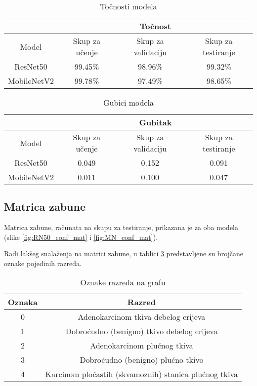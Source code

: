 \documentclass[conference, utf8]{IEEEtran}
\begin{document}

\begin{table}[ht]
	\centering
		\caption{Točnosti modela}
	\label{table:1}
\begin{tabular}{ |c|c|c|c| } 
	\hline
	& \multicolumn{3}{c|}{Točnost} \\
	\hline
	Model & Skup za učenje & Skup za validaciju & Skup za testiranje \\
	\hline \hline
	ResNet50 & 99.45\% & 98.96\% & 99.32\%  \\
	\hline
	MobileNetV2 & 99.78\% & 97.49\% & 98.65\%  \\
	\hline
	\end{tabular}
\end{table}
\begin{table}[ht]
	\centering
	\caption{Gubici modela}
	\label{table:2}
	\begin{tabular}{ |c|c|c|c| } 
		\hline
		& \multicolumn{3}{c|}{Gubitak} \\
		\hline
		Model & Skup za učenje & Skup za validaciju & Skup za testiranje \\
		\hline \hline
		ResNet50 & 0.049 & 0.152 & 0.091  \\
		\hline
		MobileNetV2 & 0.011 & 0.100 & 0.047 \\
		\hline
	\end{tabular}
\end{table}



\pagebreak

\subsection{Matrica zabune}
Matrica zabune, računata na skupu za testiranje, prikazana je za oba modela (slike \ref{fig:RN50_conf_mat} i \ref{fig:MN_conf_mat}).

Radi lakšeg snalaženja na matrici zabune, u tablici \ref{table:3} predstavljene su brojčane oznake pojedinih razreda.

\begin{table}[ht]
	\centering
	\caption{Oznake razreda na grafu}
	\label{table:3}
	\begin{tabular}{ |c|c| } 
		\hline
		Oznaka & Razred \\
		\hline \hline
		0 & Adenokarcinom tkiva debelog crijeva \\
		\hline
		1 & Dobroćudno (benigno) tkivo debelog crijeva \\
		\hline
		2 & Adenokarcinom plućnog tkiva \\
		\hline
		3 & Dobroćudno (benigno) plućno tkivo \\
		\hline
		4 & Karcinom pločastih (skvamoznih) stanica plućnog tkiva \\
		\hline
	\end{tabular}
\end{table}
\end{document}
